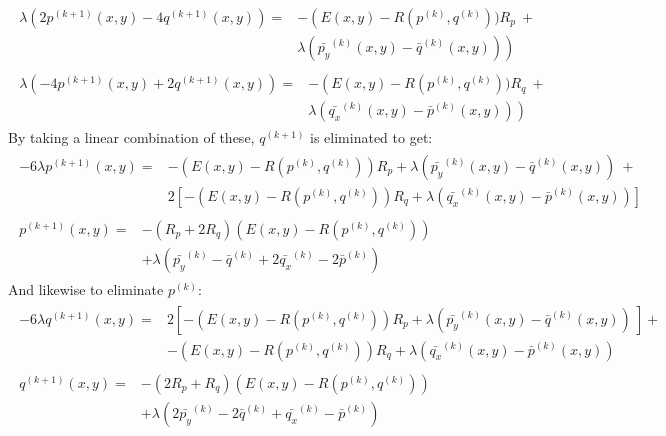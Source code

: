 \documentclass[letter,11pt]{article}
\begin{document}
{{\begin{align*}
	\begin{split}
	\lambda\left( 2p^{(k+1)}(x,y) - 4q^{(k+1)}(x,y)\right) = &
     	-\left(E(x,y)-R(p^{(k)},q^{(k)}))R_p \ + \right.\\
	& \left.\lambda ( \bar{p_y}^{(k)}(x,y) - \bar{q}^{(k)}(x,y) )\right)
	\end{split}\\
	\begin{split}
    \lambda\left( -4p^{(k+1)}(x,y) + 2q^{(k+1)}(x,y)\right) = &
        -\left(E(x,y)-R(p^{(k)},q^{(k)}))R_q \ + \right.\\
		& \left. \lambda ( \bar{q_x}^{(k)}(x,y) - \bar{p}^{(k)}(x,y) ) \right)
	\end{split}
\end{align*}
By taking a linear combination of these, $q^{(k+1)}$ is eliminated to get:
\begin{align*}
	\begin{split}
	-6\lambda p^{(k+1)}(x,y) = & 
	 -\left(E(x,y)-R(p^{(k)},q^{(k)})\right)R_p + \lambda ( \bar{p_y}^{(k)}(x,y) - \bar{q}^{(k)}(x,y)) \ + \\
      & 2\left[  -\left(E(x,y)-R(p^{(k)},q^{(k)})\right)R_q + \lambda ( \bar{q_x}^{(k)}(x,y) - \bar{p}^{(k)}(x,y))\right]
  \end{split}\\
  \begin{split}
	  p^{(k+1)}(x,y) = & - (R_p + 2 R_q)\left(E(x,y)-R(p^{(k)},q^{(k)})\right) \\ 
	  & + \lambda\left( \bar{p_y}^{(k)} - \bar{q}^{(k)} + 2\bar{q_x}^{(k)} -       2\bar{p}^{(k)}\right)
  \end{split}
\end{align*}
And likewise to eliminate $p^{(k)}$:
\begin{align*}
	\begin{split}
		-6\lambda q^{(k+1)}(x,y) = & 
		2\left[ -\left(E(x,y)-R(p^{(k)},q^{(k)})\right)R_p + \lambda ( \bar{p_y}^{(k)}(x,y) - \bar{q}^{(k)}(x,  y)) \ \right]+ \\
		& -\left(E(x,y)-R(p^{(k)},q^{(k)})\right)R_q + \lambda ( \bar{q_x}^{(k)}(x,y) -       \bar{p}^{(k)}(x,y))
	\end{split}\\
	\begin{split}
		q^{(k+1)}(x,y) = & - (2 R_p + R_q)\left(E(x,y)-R(p^{(k)},q^{(k)})\right)\\ 
		& + \lambda\left( 2\bar{p_y}^{(k)} - 2\bar{q}^{(k)} + \bar{q_x}^{(k)} - \bar{p}^{(k)}\right)
	\end{split}
\end{align*}


}}
\end{document}

